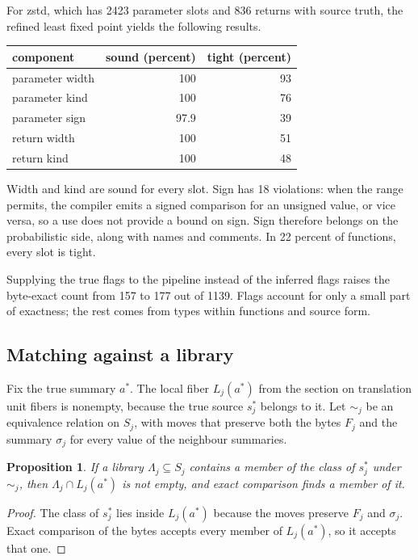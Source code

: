 \documentclass[11pt]{article}
\newtheorem{proposition}[theorem]{Proposition}
\theoremstyle{definition}
\theoremstyle{remark}
\begin{document}
For zstd, which has 2423 parameter slots and 836 returns with source truth, the refined least fixed point yields the following results.

\begin{center}
\begin{tabular}{lrr}
component & sound (percent) & tight (percent) \\
\hline
parameter width & 100 & 93 \\
parameter kind & 100 & 76 \\
parameter sign & 97.9 & 39 \\
return width & 100 & 51 \\
return kind & 100 & 48 \\
\end{tabular}
\end{center}

Width and kind are sound for every slot. Sign has 18 violations: when the range permits, the compiler emits a signed comparison for an unsigned value, or vice versa, so a use does not provide a bound on sign. Sign therefore belongs on the probabilistic side, along with names and comments. In 22 percent of functions, every slot is tight.

Supplying the true flags to the pipeline instead of the inferred flags raises the byte-exact count from 157 to 177 out of 1139. Flags account for only a small part of exactness; the rest comes from types within functions and source form.

\subsection{Matching against a library}

Fix the true summary $a^*$. The local fiber $L_j(a^*)$ from the section on translation unit fibers is nonempty, because the true source $s^*_j$ belongs to it. Let $\sim_j$ be an equivalence relation on $S_j$, with moves that preserve both the bytes $F_j$ and the summary $\sigma_j$ for every value of the neighbour summaries.

\begin{proposition}
If a library $\Lambda_j \subseteq S_j$ contains a member of the class of $s^*_j$ under $\sim_j$, then $\Lambda_j \cap L_j(a^*)$ is not empty, and exact comparison finds a member of it.
\end{proposition}

\begin{proof}
The class of $s^*_j$ lies inside $L_j(a^*)$ because the moves preserve $F_j$ and $\sigma_j$. Exact comparison of the bytes accepts every member of $L_j(a^*)$, so it accepts that one.
\end{proof}
\end{document}
